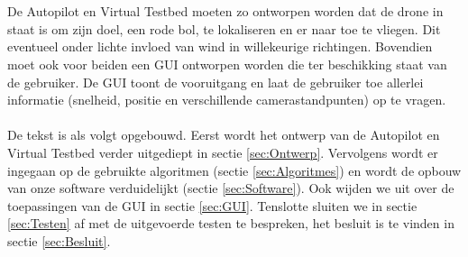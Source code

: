 \\
\\
De Autopilot en Virtual Testbed moeten zo ontworpen worden dat de drone in staat is om zijn doel, een rode bol, te lokaliseren en er naar toe te vliegen. Dit eventueel onder lichte invloed van wind in willekeurige richtingen. Bovendien moet ook voor beiden een GUI ontworpen worden die ter beschikking staat van de gebruiker. De GUI toont de vooruitgang en laat de gebruiker toe allerlei informatie (snelheid, positie en verschillende camerastandpunten) op te vragen.
\\
\\
De tekst is als volgt opgebouwd. Eerst wordt het ontwerp van de Autopilot en Virtual Testbed verder uitgediept in sectie \ref{sec:Ontwerp}. Vervolgens wordt er ingegaan op de gebruikte algoritmen (sectie \ref{sec:Algoritmes}) en wordt de opbouw van onze software verduidelijkt (sectie \ref{sec:Software}). Ook wijden we uit over de toepassingen van de GUI in sectie \ref{sec:GUI}. Tenslotte sluiten we in sectie \ref{sec:Testen} af met de uitgevoerde testen te bespreken, het besluit is te vinden in sectie \ref{sec:Besluit}. \\
